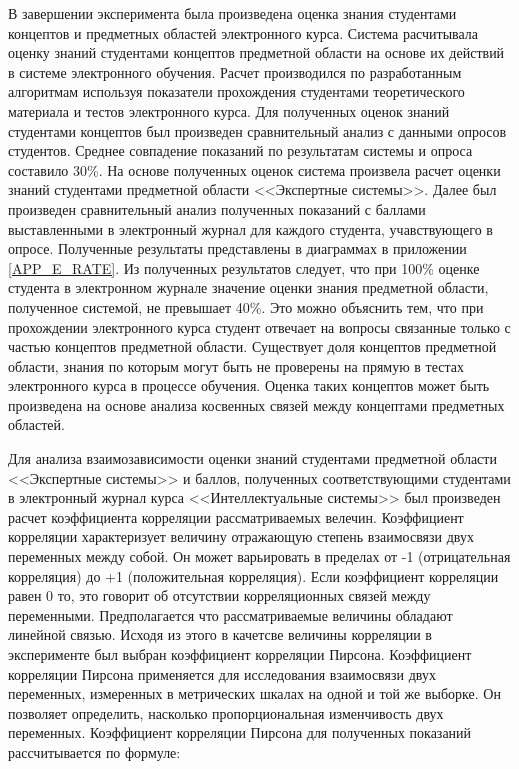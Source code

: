 В завершении эксперимента была произведена оценка знания студентами концептов и предметных областей электронного курса. Система расчитывала оценку знаний студентами концептов предметной области на основе их действий в системе электронного обучения. Расчет производился по разработанным алгоритмам используя показатели прохождения студентами теоретического материала и тестов электронного курса. Для полученных оценок знаний студентами концептов был произведен сравнительный анализ с данными опросов студентов. Среднее совпадение показаний по результатам системы и опроса составило 30\%. На основе полученных оценок система произвела расчет оценки знаний студентами предметной области <<Экспертные системы>>. Далее был произведен сравнительный анализ полученных показаний с баллами выставленными в электронный журнал для каждого студента, учавствующего в опросе. Полученные результаты представлены в диаграммах в приложении \ref{APP_E_RATE}. Из полученных результатов следует, что при 100\% оценке студента в электронном журнале значение оценки знания предметной области, полученное системой, не превышает 40\%. Это можно объяснить тем, что при прохождении электронного курса студент отвечает на вопросы связанные только с частью концептов предметной области. Существует доля концептов предметной области, знания по которым могут быть не проверены на прямую в тестах электронного курса в процессе обучения. Оценка таких концептов может быть произведена на основе анализа косвенных связей между концептами предметных областей.

Для анализа взаимозависимости оценки знаний студентами предметной области  <<Экспертные системы>> и баллов, полученных соответствующими студентами в электронный журнал курса <<Интеллектуальные системы>> был произведен расчет коэффициента корреляции рассматриваемых велечин. Коэффициент корреляции характеризует величину отражающую степень взаимосвязи двух переменных между собой. Он может варьировать в пределах от -1 (отрицательная корреляция) до +1 (положительная корреляция). Если коэффициент корреляции равен 0 то, это говорит об отсутствии корреляционных связей между переменными. Предполагается что рассматриваемые величины обладают линейной связью. Исходя из этого в качетсве величины корреляции в эксперименте был выбран коэффициент корреляции Пирсона. Коэффициент корреляции Пирсона применяется для исследования взаимосвязи двух переменных, измеренных в метрических шкалах на одной и той же выборке. Он позволяет определить, насколько пропорциональная изменчивость двух переменных. Коэффициент корреляции Пирсона для полученных показаний  рассчитывается по формуле:

